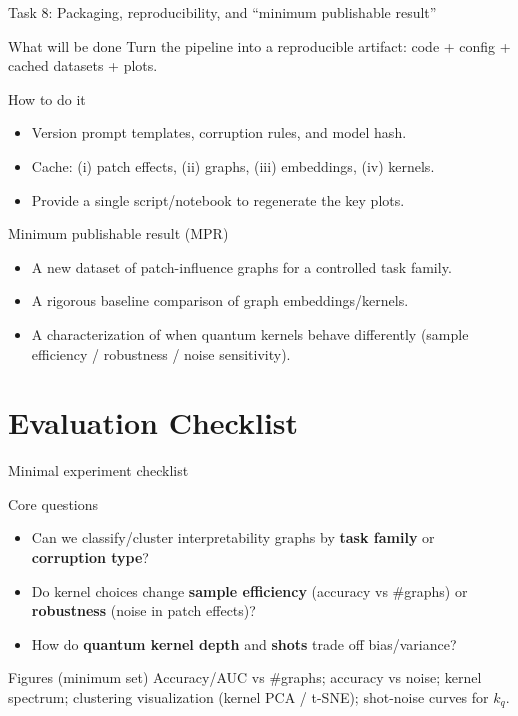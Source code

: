 \documentclass[aspectratio=169,xcolor={dvipsnames}]{beamer}
\renewcommand{\accent}[1]{\textbf{#1}}
\begin{document}
\begin{frame}[shrink=20]{Task 8: Packaging, reproducibility, and “minimum publishable result”}
\small
\begin{block}{What will be done}
Turn the pipeline into a reproducible artifact: code + config + cached datasets + plots.
\end{block}

\begin{block}{How to do it}
\begin{itemize}\setlength\itemsep{3pt}
\item Version prompt templates, corruption rules, and model hash.
\item Cache: (i) patch effects, (ii) graphs, (iii) embeddings, (iv) kernels.
\item Provide a single script/notebook to regenerate the key plots.
\end{itemize}
\end{block}

\begin{block}{Minimum publishable result (MPR)}
\begin{itemize}\setlength\itemsep{2pt}
\item A new dataset of patch-influence graphs for a controlled task family.
\item A rigorous baseline comparison of graph embeddings/kernels.
\item A characterization of when quantum kernels behave differently (sample efficiency / robustness / noise sensitivity).
\end{itemize}
\end{block}
\end{frame}

\section{Evaluation Checklist}

\begin{frame}{Minimal experiment checklist}
\small
\begin{block}{Core questions}
\begin{itemize}\setlength\itemsep{3pt}
\item Can we classify/cluster interpretability graphs by \accent{task family} or \accent{corruption type}?
\item Do kernel choices change \accent{sample efficiency} (accuracy vs \#graphs) or \accent{robustness} (noise in patch effects)?
\item How do \accent{quantum kernel depth} and \accent{shots} trade off bias/variance?
\end{itemize}
\end{block}

\begin{block}{Figures (minimum set)}
Accuracy/AUC vs \#graphs;\;
accuracy vs noise;\;
kernel spectrum;\;
clustering visualization (kernel PCA / t-SNE);\;
shot-noise curves for $k_q$.
\end{block}
\end{frame}
\end{document}
